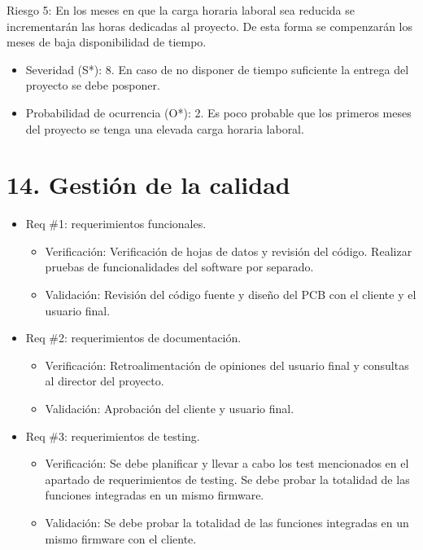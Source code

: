 \documentclass[
11pt, %
codirector, %
]{charter}
\begin{document}
Riesgo 5: En los meses en que la carga horaria laboral sea reducida se incrementarán las horas dedicadas al proyecto. De esta forma se compenzarán los meses de baja disponibilidad de tiempo.
\begin{itemize}
	\item Severidad (S*): 8. En caso de no disponer de tiempo suficiente la entrega del proyecto se debe posponer.
	\item Probabilidad de ocurrencia (O*): 2. Es poco probable que los primeros meses del proyecto se tenga una elevada carga horaria laboral.    
\end{itemize}


\section{14. Gestión de la calidad}
\label{sec:calidad}

\begin{itemize} 
\item Req \#1: requerimientos funcionales.
\begin{itemize}
	\item Verificación: Verificación de hojas de datos y revisión del código. Realizar pruebas de funcionalidades del software por separado. 
	\item Validación: Revisión del código fuente y diseño del PCB con el cliente y el usuario final.
\end{itemize}
\item Req \#2: requerimientos de documentación.
\begin{itemize}
	\item Verificación: Retroalimentación de opiniones del usuario final y consultas al director del proyecto.
	\item Validación: Aprobación del cliente y usuario final.  
\end{itemize}
\item Req \#3: requerimientos de testing.
\begin{itemize}
	\item Verificación: Se debe planificar y llevar a cabo los test mencionados en el apartado de requerimientos de testing. Se debe probar la totalidad de las funciones integradas en un mismo firmware.
	\item Validación: Se debe probar la totalidad de las funciones integradas en un mismo firmware con el cliente.  
\end{itemize}

\end{itemize}
\end{document}
